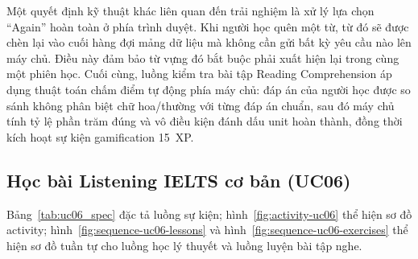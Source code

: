 Một quyết định kỹ thuật khác liên quan đến trải nghiệm là xử lý lựa chọn ``Again'' hoàn toàn ở phía trình duyệt. Khi người học quên một từ, từ đó sẽ được chèn lại vào cuối hàng đợi mảng dữ liệu mà không cần gửi bất kỳ yêu cầu nào lên máy chủ. Điều này đảm bảo từ vựng đó bắt buộc phải xuất hiện lại trong cùng một phiên học. Cuối cùng, luồng kiểm tra bài tập Reading Comprehension áp dụng thuật toán chấm điểm tự động phía máy chủ: đáp án của người học được so sánh không phân biệt chữ hoa/thường với từng đáp án chuẩn, sau đó máy chủ tính tỷ lệ phần trăm đúng và vô điều kiện đánh dấu unit hoàn thành, đồng thời kích hoạt sự kiện gamification 15~XP.

\subsection{Học bài Listening IELTS cơ bản (UC06)}
Bảng~\ref{tab:uc06_spec} đặc tả luồng sự kiện; hình~\ref{fig:activity-uc06} thể hiện sơ đồ activity; hình~\ref{fig:sequence-uc06-lessons} và hình~\ref{fig:sequence-uc06-exercises} thể hiện sơ đồ tuần tự cho luồng học lý thuyết và luồng luyện bài tập nghe.
